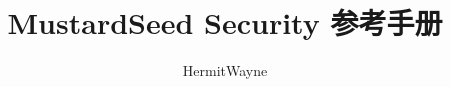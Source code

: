 \documentclass[a4paper]{article}
\begin{document}
\begin{CJK*}{UTF8}{song}

\title{MustardSeed Security 参考手册}
\author{HermitWayne}
\date{}
\maketitle





\end{CJK*}
\end{document}
